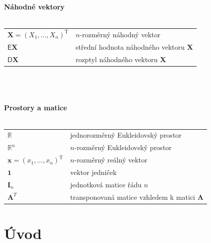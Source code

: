 \documentclass[a4paper,12pt]{report}
\theoremstyle{definition} \newtheorem{definice}[veta]{Definice}
\theoremstyle{remark}
\begin{document}
%
%
   \textbf{Náhodné vektory}\\\\
   \begin{tabular}{p{4cm} p{9.3cm}}
  $\boldsymbol{X}=(X_1,\dots,X_n)^\mathrm{T}$                 &     $n$-rozměrný náhodný vektor \\
   $\mathsf{E}\boldsymbol{X}$                             &     střední hodnota náhodného vektoru $\boldsymbol{X}$\\
   $\mathsf{D}\boldsymbol{X}$                             &   rozptyl  náhodného vektoru $\boldsymbol{X}$\\
   \end{tabular}\\\\\\
%
%
%
   \textbf{Prostory a matice}\\\\
   \begin{tabular}{p{4cm} p{9.3cm}}
   $\mathbb{R}$                              &   jednorozměrný Eukleidovský prostor \\
   $\mathbb{R}^n$                              &     $n$-rozměrný Eukleidovský prostor \\
   $\boldsymbol{x}=(x_1,\ldots,x_n)^\mathrm{T}$             &    $n$-rozměrný reálný vektor \\
    $\boldsymbol{1}$                           &   vektor jedniček\\
   $\mathbf{I}_n$                              &    jednotková matice řádu $n$ \\
   $\mathbf{A}^T$                              &   transponovaná matice vzhledem k matici $\mathbf{A}$\\
   \end{tabular}
%
%


\chapter{Úvod}
\setcounter{page}{1}
\end{document}
